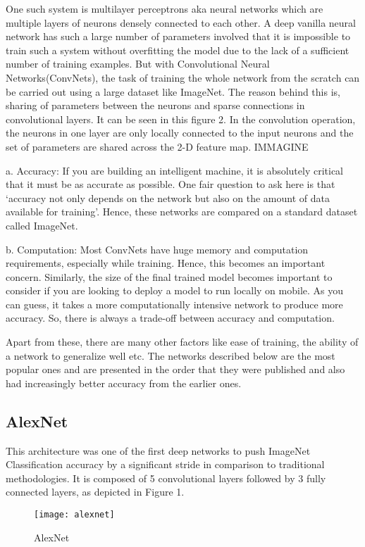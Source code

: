 \documentclass[../main.tex]{subfiles}
\begin{document}
One such system is multilayer perceptrons aka neural networks which are multiple layers of neurons densely connected to each other. A deep vanilla neural network has such a large number of parameters involved that it is impossible to train such a system without overfitting the model due to the lack of a sufficient number of training examples. But with Convolutional Neural Networks(ConvNets), the task of training the whole network from the scratch can be carried out using a large dataset like ImageNet. The reason behind this is, sharing of parameters between the neurons and sparse connections in convolutional layers. It can be seen in this figure 2. In the convolution operation, the neurons in one layer are only locally connected to the input neurons and the set of parameters are shared across the 2-D feature map.
IMMAGINE

a. Accuracy:
If you are building an intelligent machine, it is absolutely critical that it must be as accurate as possible. One fair question to ask here is that ‘accuracy not only depends on the network but also on the amount of data available for training’. Hence, these networks are compared on a standard dataset called ImageNet.

b. Computation:
Most ConvNets have huge memory and computation requirements, especially while training. Hence, this becomes an important concern. Similarly, the size of the final trained model becomes important to consider if you are looking to deploy a model to run locally on mobile. As you can guess, it takes a more computationally intensive network to produce more accuracy. So, there is always a trade-off between accuracy and computation.

Apart from these, there are many other factors like ease of training, the ability of a network to generalize well etc. The networks described below are the most popular ones and are presented in the order that they were published and also had increasingly better accuracy from the earlier ones.

\subsection{AlexNet}
This architecture was one of the first deep networks to push ImageNet Classification accuracy by a significant stride in comparison to traditional methodologies. It is composed of 5 convolutional layers followed by 3 fully connected layers, as depicted in Figure 1.
\begin{figure}[htbp] 
\centering 
\texttt{[image: alexnet]}
\caption{AlexNet} 
\label{alexnet} 
\end{figure} 
\end{document}
